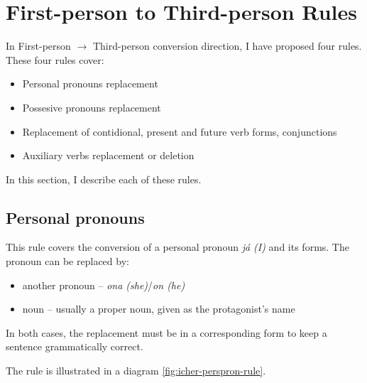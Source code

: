 \section{First-person to Third-person Rules}
In First-person $\rightarrow$ Third-person conversion direction, I have proposed four rules. These four rules cover:
	\begin{itemize}
		\item Personal pronouns replacement
		\item Possesive pronouns replacement
		\item Replacement of contidional, present and future verb forms, conjunctions
		\item Auxiliary verbs replacement or deletion
	\end{itemize}

In this section, I describe each of these rules.

\subsection{Personal pronouns}

This rule covers the conversion of a personal pronoun \emph{já (I)} and its forms. The pronoun can be replaced by:
	\begin{itemize}
		\item another pronoun -- \emph{ona (she)}/\emph{on (he)}
		\item noun -- usually a proper noun, given as the protagonist's name
	\end{itemize}

In both cases, the replacement must be in a corresponding form to keep a sentence grammatically correct.

The rule is illustrated in a diagram \ref{fig:icher-perspron-rule}.

